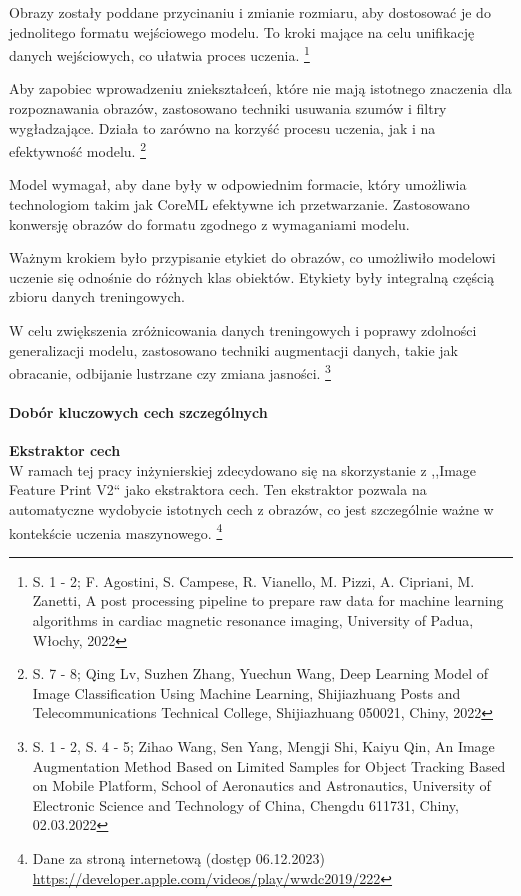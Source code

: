 \documentclass[12pt, a4paper, twoside, openany]{book}
\newcommand{\forceindent}{\leavevmode{\parindent=1.3em\indent}}
\begin{document}
Obrazy zostały poddane przycinaniu i zmianie rozmiaru, aby dostosować je do jednolitego formatu wejściowego modelu.
To kroki mające na celu unifikację danych wejściowych, co ułatwia proces uczenia. \footnote{
    S. 1 - 2; F. Agostini, S. Campese, R. Vianello, M. Pizzi, A. Cipriani, M. Zanetti, A post processing pipeline to prepare raw data for machine learning algorithms in cardiac magnetic resonance imaging, University of Padua, Włochy, 2022
}

Aby zapobiec wprowadzeniu zniekształceń, które nie mają istotnego znaczenia dla rozpoznawania obrazów, zastosowano techniki usuwania szumów i filtry wygładzające.
Działa to zarówno na korzyść procesu uczenia, jak i na efektywność modelu. \footnote{S. 7 - 8; Qing Lv, Suzhen Zhang, Yuechun Wang, Deep Learning Model of Image Classification Using
Machine Learning, Shijiazhuang Posts and Telecommunications Technical College, Shijiazhuang 050021, Chiny, 2022}

Model wymagał, aby dane były w odpowiednim formacie, który umożliwia technologiom takim jak CoreML efektywne ich przetwarzanie.
Zastosowano konwersję obrazów do formatu zgodnego z wymaganiami modelu.

Ważnym krokiem było przypisanie etykiet do obrazów, co umożliwiło modelowi uczenie się odnośnie do różnych klas obiektów.
Etykiety były integralną częścią zbioru danych treningowych.

W celu zwiększenia zróżnicowania danych treningowych i poprawy zdolności generalizacji modelu, zastosowano techniki augmentacji danych, takie jak obracanie, odbijanie lustrzane czy zmiana jasności. \footnote{ S. 1 - 2, S. 4 - 5; Zihao Wang, Sen Yang, Mengji Shi, Kaiyu Qin, An Image Augmentation Method Based on Limited Samples for Object Tracking Based on Mobile Platform, School of Aeronautics and Astronautics, University of Electronic Science and Technology of China, Chengdu 611731, Chiny, 02.03.2022 }

\paragraph{Dobór kluczowych cech szczególnych\\}
\forceindent \textbf{ Ekstraktor cech\\}
\indent W ramach tej pracy inżynierskiej zdecydowano się na skorzystanie z ,,Image Feature Print V2`` jako ekstraktora cech.
Ten ekstraktor pozwala na automatyczne wydobycie istotnych cech z obrazów, co jest szczególnie ważne w kontekście uczenia maszynowego. \footnote{Dane za stroną internetową (dostęp 06.12.2023) \url{https://developer.apple.com/videos/play/wwdc2019/222}}
\end{document}
